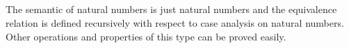 {\begin{code}
\\
\> \AgdaSymbol{\{} \AgdaSymbol{\}} \AgdaSymbol{\{} \AgdaSymbol{\}} \AgdaSymbol{\{} \AgdaSymbol{\}}   \AgdaSymbol{=}  \AgdaSymbol{\{}\AgdaSymbol{\}} \AgdaSymbol{\{}\AgdaSymbol{\}} \AgdaSymbol{\{}\AgdaSymbol{\}}  \<%
\\
%
\\
%
\\
\>\<\end{code}
}


The semantic of natural numbers is just natural numbers and the equivalence relation is defined recursively with respect to case analysis on natural numbers. Other operations and properties of this type can be proved easily.

